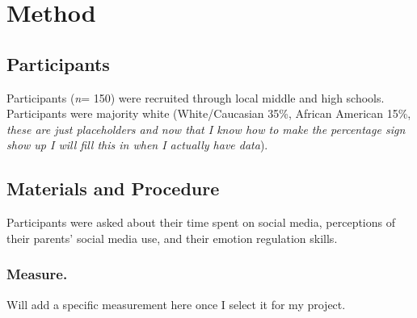 \section{Method}
\subsection{Participants}
Participants (\textit{n}= 150) were recruited through local middle and high schools. Participants were majority white (White/Caucasian 35\%, African American 15\%, \textit{these are just placeholders and now that I know how to make the percentage sign show up I will fill this in when I actually have data}). 
\subsection{Materials and Procedure}
{Participants were asked about their time spent on social media, perceptions of their parents' social media use, and their emotion regulation skills.}
\subsubsection{Measure.}Will add a specific measurement here once I select it for my project.